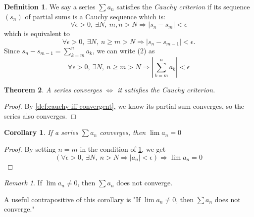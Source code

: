 \documentclass[12pt, lettersize]{book}
\theoremstyle{plain}
\newtheorem{thm}{Theorem}[section]
\newtheorem{cor}{Corollary}[thm]
\theoremstyle{definition}
\newtheorem{dfn}[thm]{Definition}
\theoremstyle{remark}
\newtheorem*{rem}{Remark}
\begin{document}
		\setcounter{equation}{0}
		\begin{dfn}\label{def:cauchy criterion}
		We say a series $\sum a_n$ satisfies the \emph{Cauchy criterion} if its sequence $(s_n)$ of partial sums is a
		Cauchy sequence which is:
		\begin{equation}
			\forall\epsilon>0,\ \exists N,\ m,n>N\Rightarrow|s_n-s_m|<\epsilon
		\end{equation}
		which is equivalent to
		\begin{equation}
			\forall\epsilon>0,\ \exists N,\ n\geq m>N\Rightarrow|s_n-s_{m-1}|<\epsilon.
		\end{equation}
		Since $s_n-s_{m-1}=\sum_{k=m}^{n}a_k$, we can write (2) as
		\begin{equation}
			\forall\epsilon>0,\ \exists N,\ n\geq m>N\Rightarrow\left|\sum_{k=m}^{n}a_k\right|<\epsilon
		\end{equation}
		\end{dfn}
		
		\begin{thm}
		A series converges $\iff$ it satisfies the Cauchy criterion. 
		\end{thm}
		\begin{proof}
		By \ref{def:cauchy iff convergent}, we know its partial sum converges, so the series also converges.
		\end{proof}
		\begin{cor}\label{def:If a_n converges then lim(a_n)=0}
		If a series $\sum a_n$ converges, then $\lim a_n=0$
		\end{cor}
		\begin{proof}
		By setting $n=m$ in the condition of \ref{def:cauchy criterion}, we get
		\begin{displaymath}
			\left(\forall\epsilon>0,\ \exists N,\ n>N\Rightarrow\left|a_n\right|<\epsilon\right)\Rightarrow\lim a_n=0
		\end{displaymath}
		\end{proof}
		\begin{rem}
			If $\lim a_n\neq0$, then $\sum a_n$ does not converge.
		\end{rem}
		A useful contrapositive of this corollary is "If $\lim a_n\neq0$, then $\sum a_n$ does not converge."
		
\end{document}
